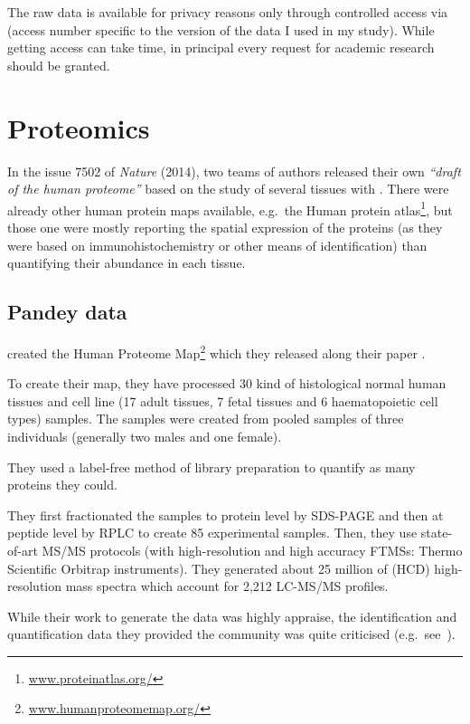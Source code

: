 The raw data is available for privacy reasons only through controlled access via
 (access number specific to the version of the data I used
in my study). While getting access can take time, in principal every request for
academic research should be granted.


\section{Proteomics}

In the issue 7502 of \textit{Nature} (2014), two teams of authors released their own
\emph{``draft of the human proteome''} based on the study of several tissues
with \ms. There were already other human protein maps available,
e.g.\ the Human protein atlas\footnote{%
\href{http://www.humanproteomemap.org/}{www.proteinatlas.org/}}, but those one
were mostly reporting the spatial expression of the proteins (as they were based
on immunohistochemistry or other means of identification) than
quantifying their abundance in each tissue.


\subsection{Pandey data}

\cite{PandeyData} created the Human Proteome Map\footnote{%
\href{http://www.humanproteomemap.org/}{\small www.humanproteomemap.org/}} which
they released along their paper .

To create their map, they have processed 30 kind of histological normal human
tissues and cell line (17 adult tissues, 7 fetal tissues and 6 haematopoietic
cell types) samples. The samples were created from pooled samples of three
individuals (generally two males and one female).

They used a label-free method of library preparation to quantify as many proteins
they could.

They first fractionated the samples to protein level by
\gls{SDS-PAGE} and then at peptide level by \gls{RPLC} to create 85 experimental
samples. Then, they use
state-of-art \gls{MS/MS} protocols (with high-resolution and high accuracy
\glspl{FTMS}: Thermo Scientific Orbitrap instruments).
They generated about 25 million of (\gls{HCD})
high-resolution mass spectra which account for 2,212 \gls{LC-MS/MS} profiles.

While their work to generate the data was highly appraise, the identification and
quantification data they provided the community was quite criticised
(e.g.\ see~\cite{Ezkurdia2014-qx}).

